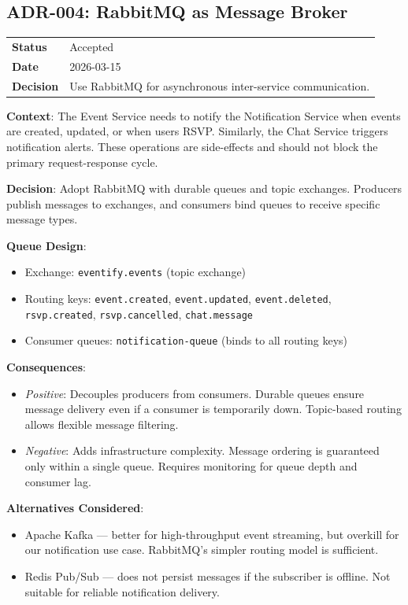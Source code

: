 \subsection{ADR-004: RabbitMQ as Message Broker}

\begin{tabular}{p{3cm}p{10cm}}
\textbf{Status} & Accepted \\
\textbf{Date} & 2026-03-15 \\
\textbf{Decision} & Use RabbitMQ for asynchronous inter-service communication. \\
\end{tabular}

\textbf{Context}: The Event Service needs to notify the Notification Service when events are created, updated, or when users RSVP. Similarly, the Chat Service triggers notification alerts. These operations are side-effects and should not block the primary request-response cycle.

\textbf{Decision}: Adopt RabbitMQ with durable queues and topic exchanges. Producers publish messages to exchanges, and consumers bind queues to receive specific message types.

\textbf{Queue Design}:
\begin{itemize}
    \item Exchange: \texttt{eventify.events} (topic exchange)
    \item Routing keys: \texttt{event.created}, \texttt{event.updated}, \texttt{event.deleted}, \texttt{rsvp.created}, \texttt{rsvp.cancelled}, \texttt{chat.message}
    \item Consumer queues: \texttt{notification-queue} (binds to all routing keys)
\end{itemize}

\textbf{Consequences}:
\begin{itemize}
    \item \textit{Positive}: Decouples producers from consumers. Durable queues ensure message delivery even if a consumer is temporarily down. Topic-based routing allows flexible message filtering.
    \item \textit{Negative}: Adds infrastructure complexity. Message ordering is guaranteed only within a single queue. Requires monitoring for queue depth and consumer lag.
\end{itemize}

\textbf{Alternatives Considered}:
\begin{itemize}
    \item Apache Kafka --- better for high-throughput event streaming, but overkill for our notification use case. RabbitMQ's simpler routing model is sufficient.
    \item Redis Pub/Sub --- does not persist messages if the subscriber is offline. Not suitable for reliable notification delivery.
\end{itemize}
